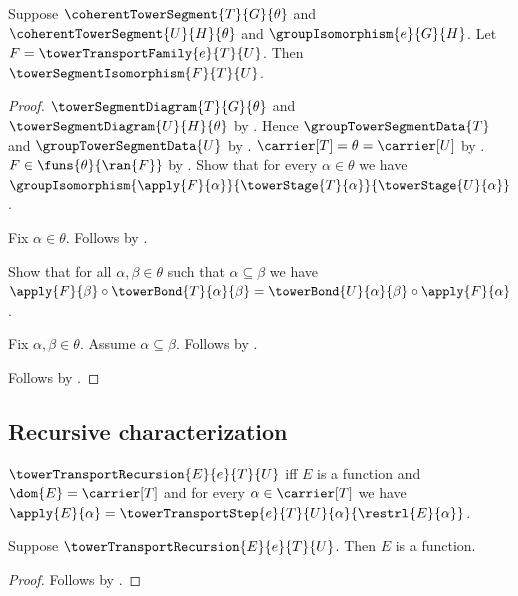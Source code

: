 \begin{theorem}\label{coherent_tower_transport_isomorphism}
    Suppose $\coherentTowerSegment{T}{G}{\theta}$ and
        $\coherentTowerSegment{U}{H}{\theta}$ and
        $\groupIsomorphism{e}{G}{H}$.
    Let $F=\towerTransportFamily{e}{T}{U}$.
    Then $\towerSegmentIsomorphism{F}{T}{U}$.
\end{theorem}
\begin{proof}
    $\towerSegmentDiagram{T}{G}{\theta}$ and
        $\towerSegmentDiagram{U}{H}{\theta}$ by
        .
    Hence $\groupTowerSegmentData{T}$ and
        $\groupTowerSegmentData{U}$ by
        .
    $\carrier[T]=\theta=\carrier[U]$ by
        .
    $F\in\funs{\theta}{\ran{F}}$ by
        .
    Show that for every $\alpha\in\theta$ we have
        $\groupIsomorphism{\apply{F}{\alpha}}
            {\towerStage{T}{\alpha}}{\towerStage{U}{\alpha}}$.
    \begin{subproof}
        Fix $\alpha\in\theta$.
        Follows by .
    \end{subproof}
    Show that for all $\alpha,\beta\in\theta$ such that
        $\alpha\subseteq\beta$ we have
        $\apply{F}{\beta}\circ\towerBond{T}{\alpha}{\beta}=
        \towerBond{U}{\alpha}{\beta}\circ\apply{F}{\alpha}$.
    \begin{subproof}
        Fix $\alpha,\beta\in\theta$.
        Assume $\alpha\subseteq\beta$.
        Follows by .
    \end{subproof}
    Follows by .
\end{proof}

\subsection{Recursive characterization}

\begin{definition}\label{tower_transport_recursion}
    $\towerTransportRecursion{E}{e}{T}{U}$ iff
        $E$ is a function and
        $\dom{E}=\carrier[T]$ and
        for every $\alpha\in\carrier[T]$ we have
            $\apply{E}{\alpha}=
                \towerTransportStep{e}{T}{U}{\alpha}{\restrl{E}{\alpha}}$.
\end{definition}

\begin{proposition}\label{tower_transport_recursion_function}
    Suppose $\towerTransportRecursion{E}{e}{T}{U}$.
    Then $E$ is a function.
\end{proposition}
\begin{proof}
    Follows by .
\end{proof}

